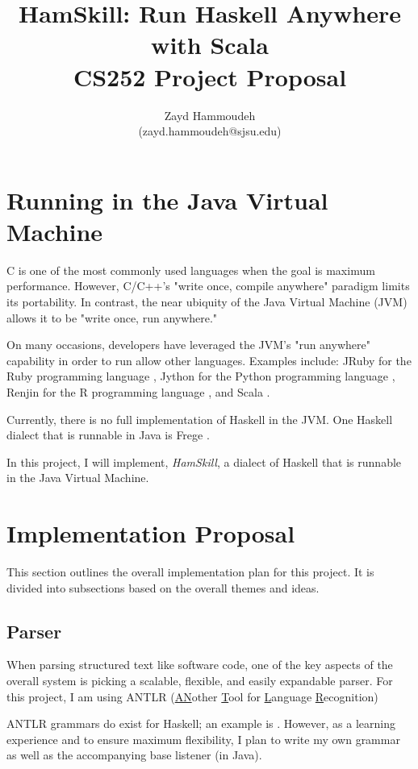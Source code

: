 \documentclass{report}
\title{HamSkill: Run Haskell Anywhere with Scala\\[1in]
	   CS252 Project Proposal}
\author{
  Zayd Hammoudeh \\
  (zayd.hammoudeh@sjsu.edu)
  }
\date{}
\begin{document}
\maketitle

\renewcommand\thesection{\arabic{section}}
\section{Running in the Java Virtual Machine}

C is one of the most commonly used languages when the goal is maximum performance.  However, C/C++'s "write once, compile anywhere" paradigm limits its portability.  In contrast, the near ubiquity of the Java Virtual Machine (JVM) allows it to be "write once, run anywhere."  

On many occasions, developers have leveraged the JVM's "run anywhere" capability in order to run allow other languages.  Examples include: JRuby for the Ruby programming language \cite{jruby}, Jython for the Python programming language \cite{jython_jvm}, Renjin for the R programming language \cite{renjin}, and Scala \cite{scala}.

Currently, there is no full implementation of Haskell in the JVM.  One Haskell dialect that is runnable in Java is Frege \cite{frege}.  

In this project, I will implement, \emph{HamSkill}, a dialect of Haskell that is runnable in the Java Virtual Machine.

\section{Implementation Proposal}

This section outlines the overall implementation plan for this project.  It is divided into subsections based on the overall themes and ideas.  

\subsection{Parser}

When parsing structured text like software code, one of the key aspects of the overall system is picking a scalable, flexible, and easily expandable parser.  For this project, I am using ANTLR (\underline{AN}other \underline{T}ool for \underline{L}anguage \underline{R}ecognition)

ANTLR grammars do exist for Haskell; an example is \cite{antlrHaskellLexer}.  However, as a learning experience and to ensure maximum flexibility, I plan to write my own grammar as well as the accompanying base listener (in Java).  
\end{document}
